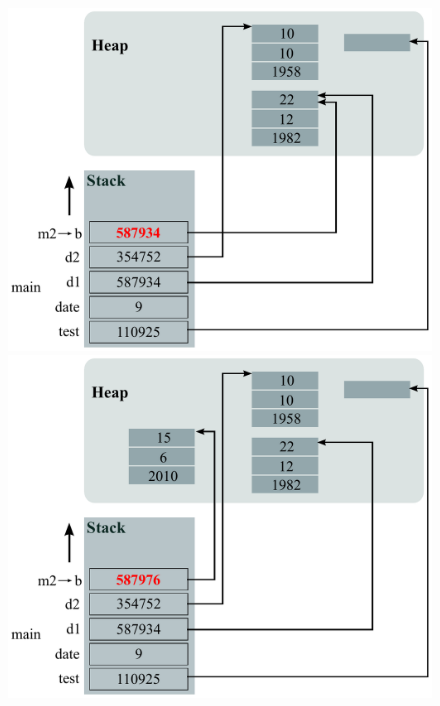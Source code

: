 \begin{figure}[htb]
  \begin{minipage}[t]{0.5\linewidth}
    \centering
    \includegraphics[width=\textwidth]{images/Java-memory-allocation/fig05.pdf}
  \end{minipage}%
  \begin{minipage}[t]{0.5\linewidth}
    \centering
    \includegraphics[width=\textwidth]{images/Java-memory-allocation/fig06.pdf}
  \end{minipage}
\end{figure}


